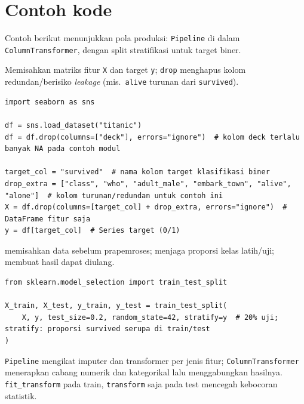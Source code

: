 \documentclass[../main.tex]{subfiles}
\begin{document}
\section{Contoh kode}

Contoh berikut menunjukkan pola produksi: \texttt{Pipeline} di dalam \texttt{ColumnTransformer}, dengan split stratifikasi untuk target biner.

\MulaiPenjelasanKode Memisahkan matriks fitur \texttt{X} dan target \texttt{y}; \texttt{drop} menghapus kolom redundan/berisiko \textit{leakage} (mis.\ \texttt{alive} turunan dari \texttt{survived}). \SelesaiPenjelasanKode

\begin{lstlisting}[caption=Titanic: pisah fitur/target dan subset kolom]
import seaborn as sns

df = sns.load_dataset("titanic")
df = df.drop(columns=["deck"], errors="ignore")  # kolom deck terlalu banyak NA pada contoh modul

target_col = "survived"  # nama kolom target klasifikasi biner
drop_extra = ["class", "who", "adult_male", "embark_town", "alive", "alone"]  # kolom turunan/redundan untuk contoh ini
X = df.drop(columns=[target_col] + drop_extra, errors="ignore")  # DataFrame fitur saja
y = df[target_col]  # Series target (0/1)
\end{lstlisting}

\MulaiPenjelasanKode {} memisahkan data sebelum prapemroses;  menjaga proporsi kelas latih/uji;  membuat hasil dapat diulang. \SelesaiPenjelasanKode

\begin{lstlisting}[caption=Split dulu; prapemroses hanya fit di data latih]
from sklearn.model_selection import train_test_split

X_train, X_test, y_train, y_test = train_test_split(
    X, y, test_size=0.2, random_state=42, stratify=y  # 20% uji; stratify: proporsi survived serupa di train/test
)
\end{lstlisting}

\MulaiPenjelasanKode \texttt{Pipeline} mengikat imputer dan transformer per jenis fitur; \texttt{ColumnTransformer} menerapkan cabang numerik dan kategorikal lalu menggabungkan hasilnya. \texttt{fit\_transform} pada train, \texttt{transform} saja pada test mencegah kebocoran statistik. \SelesaiPenjelasanKode
\end{document}
